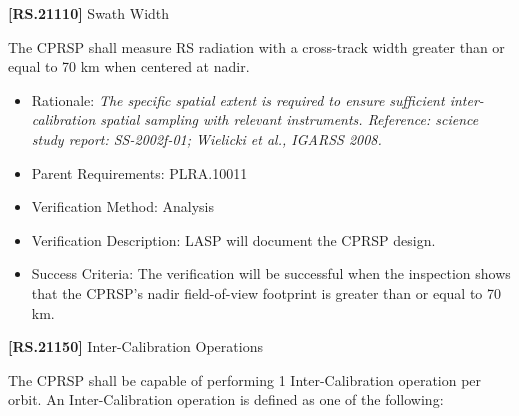 \textbf{[RS.21110]} Swath Width

The \gls{CPRSP} shall \gls{measure} \gls{RS} radiation with a cross-track width greater than or equal to 70 km when centered at nadir.

\begin{itemize}
\item{} Rationale: \emph{The specific spatial extent is required to ensure sufficient inter-calibration spatial sampling with relevant instruments. Reference: science study report: SS-2002f-01; Wielicki et al., IGARSS 2008.}

\item{} Parent Requirements: PLRA.10011

\item{} Verification Method: Analysis

\item{} Verification Description: \gls{LASP} will document the \gls{CPRSP} design.

\item{} Success Criteria: The verification will be successful when the \gls{inspection} shows that the \gls{CPRSP}'s nadir field-of-view footprint is greater than or equal to 70 km.

\end{itemize}

\textbf{[RS.21150]} Inter-Calibration Operations

The \gls{CPRSP} shall be capable of performing 1 Inter-Calibration operation per orbit. An Inter-Calibration operation is defined as one of the following:

